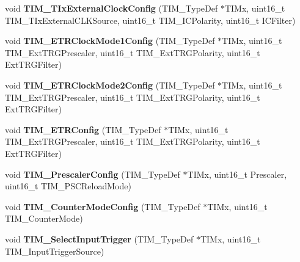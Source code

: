 \begin{DoxyCompactItemize}
\item 
\hypertarget{group__TIM__Exported__Functions_gaf460e7d9c9969044e364130e209937fc}{
void {\bfseries TIM\_\-TIxExternalClockConfig} (TIM\_\-TypeDef $\ast$TIMx, uint16\_\-t TIM\_\-TIxExternalCLKSource, uint16\_\-t TIM\_\-ICPolarity, uint16\_\-t ICFilter)}
\label{group__TIM__Exported__Functions_gaf460e7d9c9969044e364130e209937fc}

\item 
\hypertarget{group__TIM__Exported__Functions_ga47c05638b93aabcd641dbc8859e1b2df}{
void {\bfseries TIM\_\-ETRClockMode1Config} (TIM\_\-TypeDef $\ast$TIMx, uint16\_\-t TIM\_\-ExtTRGPrescaler, uint16\_\-t TIM\_\-ExtTRGPolarity, uint16\_\-t ExtTRGFilter)}
\label{group__TIM__Exported__Functions_ga47c05638b93aabcd641dbc8859e1b2df}

\item 
\hypertarget{group__TIM__Exported__Functions_ga0a9cbcbab32326cbbdaf4c111f59ec20}{
void {\bfseries TIM\_\-ETRClockMode2Config} (TIM\_\-TypeDef $\ast$TIMx, uint16\_\-t TIM\_\-ExtTRGPrescaler, uint16\_\-t TIM\_\-ExtTRGPolarity, uint16\_\-t ExtTRGFilter)}
\label{group__TIM__Exported__Functions_ga0a9cbcbab32326cbbdaf4c111f59ec20}

\item 
\hypertarget{group__TIM__Exported__Functions_ga8bdde400b7a30f3e747fe8e4962c0abe}{
void {\bfseries TIM\_\-ETRConfig} (TIM\_\-TypeDef $\ast$TIMx, uint16\_\-t TIM\_\-ExtTRGPrescaler, uint16\_\-t TIM\_\-ExtTRGPolarity, uint16\_\-t ExtTRGFilter)}
\label{group__TIM__Exported__Functions_ga8bdde400b7a30f3e747fe8e4962c0abe}

\item 
\hypertarget{group__TIM__Exported__Functions_ga45c6fd9041baf7f64c121e0172f305c7}{
void {\bfseries TIM\_\-PrescalerConfig} (TIM\_\-TypeDef $\ast$TIMx, uint16\_\-t Prescaler, uint16\_\-t TIM\_\-PSCReloadMode)}
\label{group__TIM__Exported__Functions_ga45c6fd9041baf7f64c121e0172f305c7}

\item 
\hypertarget{group__TIM__Exported__Functions_ga93941c1db20bf3794f377307df90a67b}{
void {\bfseries TIM\_\-CounterModeConfig} (TIM\_\-TypeDef $\ast$TIMx, uint16\_\-t TIM\_\-CounterMode)}
\label{group__TIM__Exported__Functions_ga93941c1db20bf3794f377307df90a67b}

\item 
\hypertarget{group__TIM__Exported__Functions_ga4252583c6ae8a73d6fc66f7e951dbc35}{
void {\bfseries TIM\_\-SelectInputTrigger} (TIM\_\-TypeDef $\ast$TIMx, uint16\_\-t TIM\_\-InputTriggerSource)}
\label{group__TIM__Exported__Functions_ga4252583c6ae8a73d6fc66f7e951dbc35}


\end{DoxyCompactItemize}
